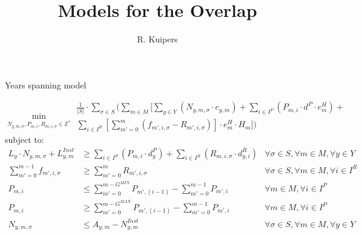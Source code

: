 \documentclass{beamer}
\title[Models for the Overlap]{Models for the Overlap}
\author{R. Kuipers}
\begin{document}

\begin{frame}{Years spanning model}
\scriptsize

\begin{equation}
	\min_{N_{y,m,\sigma}, P_{m,i}, R_{m,i,\sigma} \in \mathbb{Z}^*}
	\begin{aligned}
	\frac{1}{|S|} \cdot \sum_{\sigma \in S} ( \sum_{m \in M} [\sum_{y \in Y} 
	(N_{y,m,\sigma} \cdot c_{y,m}) +  
	\sum_{i \in I^P} (P_{m,i} \cdot d^P \cdot e^H_m) + \\
	\sum_{i \in I^R}[\sum_{m' = 0}^{m} (f_{m',i,\sigma} - R_{m',i,\sigma})] \cdot e^H_m \cdot H_m ])
	\end{aligned}	
\end{equation}
subject to:
\begin{align}
L_y \cdot N_{y,m,\sigma} + L^{Inst}_{y,m}	&\geq 	\sum_{i \in I^P} (P_{m,i} \cdot d^P_y) + \sum_{i \in I^R} (R_{m,i,\sigma} \cdot d^R_{y,i})  	
																					& \forall \sigma \in S, \forall m \in M, \forall y \in Y 	\\
\sum_{m' = 0}^{m-1} f_{m',i,\sigma}		&\geq 	\sum_{m' = 0}^m R_{m',i,\sigma}							& \forall \sigma \in S, \forall m \in M, \forall i \in I^R	\\
P_{m,i} 						&\leq 		\sum_{m' = 0}^{m-G^{MIN}} P_{m',(i-1)} - \sum_{m' = 0}^{m-1} P_{m',i}	& \forall m \in M, \forall i \in I^P 				\\
P_{m,i} 						&\geq	 	\sum_{m' = 0}^{m-G^{MAX}} P_{m',(i-1)} - \sum_{m' = 0}^{m-1} P_{m',i}	& \forall m \in M, \forall i \in I^P 				\\
N_{y,m,\sigma}					&\leq		A_{y,m} - N^{Inst}_{y,m}								& \forall \sigma \in S, \forall m \in M, \forall y \in Y
\end{align}

\end{frame}
\end{document}
